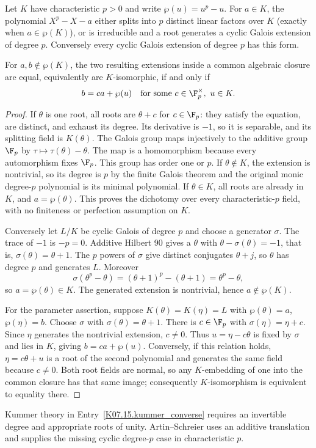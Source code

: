\begin{theorem}
Let $K$ have characteristic $p>0$ and write $\wp(u)=u^p-u$. For $a\in K$, the polynomial $X^p-X-a$ either splits into $p$ distinct linear factors over $K$ (exactly when $a\in\wp(K)$), or is irreducible and a root generates a cyclic Galois extension of degree $p$. Conversely every cyclic Galois extension of degree $p$ has this form.

For $a,b\notin\wp(K)$, the two resulting extensions inside a common algebraic closure are equal, equivalently are $K$-isomorphic, if and only if
\[b=c a+\wp(u)\quad\text{for some }c\in\F_p^\times,\ u\in K.\]
\end{theorem}
\begin{proof}
If $\theta$ is one root, all roots are $\theta+c$ for $c\in\F_p$: they satisfy the equation, are distinct, and exhaust its degree. Its derivative is $-1$, so it is separable, and its splitting field is $K(\theta)$. The Galois group maps injectively to the additive group $\F_p$ by $\tau\mapsto\tau(\theta)-\theta$. The map is a homomorphism because every automorphism fixes $\F_p$. This group has order one or $p$. If $\theta\notin K$, the extension is nontrivial, so its degree is $p$ by the finite Galois theorem and the original monic degree-$p$ polynomial is its minimal polynomial. If $\theta\in K$, all roots are already in $K$, and $a=\wp(\theta)$. This proves the dichotomy over every characteristic-$p$ field, with no finiteness or perfection assumption on $K$.

Conversely let $L/K$ be cyclic Galois of degree $p$ and choose a generator $\sigma$. The trace of $-1$ is $-p=0$. Additive Hilbert 90 gives a $\theta$ with $\theta-\sigma(\theta)=-1$, that is, $\sigma(\theta)=\theta+1$. The $p$ powers of $\sigma$ give distinct conjugates $\theta+j$, so $\theta$ has degree $p$ and generates $L$. Moreover
\[\sigma(\theta^p-\theta)=(\theta+1)^p-(\theta+1)=\theta^p-\theta,\]
so $a=\wp(\theta)\in K$. The generated extension is nontrivial, hence $a\notin\wp(K)$.

For the parameter assertion, suppose $K(\theta)=K(\eta)=L$ with $\wp(\theta)=a$, $\wp(\eta)=b$. Choose $\sigma$ with $\sigma(\theta)=\theta+1$. There is $c\in\F_p$ with $\sigma(\eta)=\eta+c$. Since $\eta$ generates the nontrivial extension, $c\ne0$. Thus $u=\eta-c\theta$ is fixed by $\sigma$ and lies in $K$, giving $b=ca+\wp(u)$. Conversely, if this relation holds, $\eta=c\theta+u$ is a root of the second polynomial and generates the same field because $c\ne0$. Both root fields are normal, so any $K$-embedding of one into the common closure has that same image; consequently $K$-isomorphism is equivalent to equality there.
\end{proof}
\begin{remark}
Kummer theory in Entry~\ref{K07.15.kummer_converse} requires an invertible degree and appropriate roots of unity. Artin--Schreier uses an additive translation and supplies the missing cyclic degree-$p$ case in characteristic $p$.
\end{remark}

